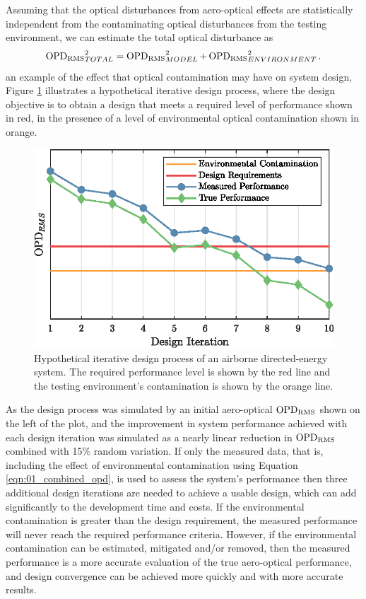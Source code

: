 Assuming that the optical disturbances from aero-optical effects are statistically independent from the contaminating optical disturbances from the testing environment, we can estimate the total optical disturbance as
\begin{equation}
  \operatorname{OPD_{RMS}}_{TOTAL}^2 = \operatorname{OPD_{RMS}}_{MODEL}^2+\operatorname{OPD_{RMS}}_{ENVIRONMENT}^2 \textrm{.}
  \label{eqn:01_combined_opd}
\end{equation}
 an example of the effect that optical contamination may have on system design, Figure \ref{fig:01_design_iteration} illustrates a hypothetical iterative design process, where the design objective is to obtain a design that meets a required level of performance shown in red, in the presence of a level of environmental optical contamination shown in orange.
\begin{figure}
  \centering
  \includegraphics{../matlab/01_introduction/design_iteration.eps}
  \caption{Hypothetical iterative design process of an airborne directed-energy system.  The required performance level is shown by the red line and the testing environment's contamination is shown by the orange line.}
  \label{fig:01_design_iteration}
\end{figure}

As the design process was simulated by an initial aero-optical $\operatorname{OPD_{RMS}}$ shown on the left of the plot, and the improvement in system performance achieved with each design iteration was simulated as a nearly linear reduction in $\operatorname{OPD_{RMS}}$ combined with 15\% random variation.
If only the measured data, that is, including the effect of environmental contamination using Equation \ref{eqn:01_combined_opd}, is used to assess the system's performance then three additional design iterations are needed to achieve a usable design, which can add significantly to the development time and costs.
If the environmental contamination is greater than the design requirement, the measured performance will never reach the required performance criteria.
However, if the environmental contamination can be estimated, mitigated and/or removed, then the measured performance is a more accurate evaluation of the true aero-optical performance, and design convergence can be achieved more quickly and with more accurate results.

